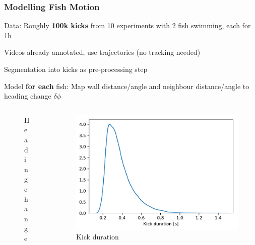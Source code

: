 \documentclass{beamer}
\begin{document}
\begin{frame}
  \frametitle{Modelling Fish Motion}
Data: Roughly \textbf{100k kicks} from 10 experiments with 2 fish swimming, each for 1h

Videos already annotated, use trajectories (\alert{no tracking needed})

Segmentation into kicks as pre-processing step

Model \textbf{for each} fish: Map wall distance/angle and neighbour distance/angle to heading change $\delta \phi$
\begin{columns}
  \begin{column}{0.24\linewidth}
    \begin{figure}[h]
      \centering
 \caption*{Heading change}
\end{figure}
\end{column}

\begin{column}{0.4\linewidth}
  \begin{figure}[h]
    \centering
\includegraphics[clip, width=0.8\linewidth]{kick_duration.pdf}
    \caption*{Kick duration}
  \end{figure}
\end{column}


\end{columns}
\end{frame}
\end{document}
